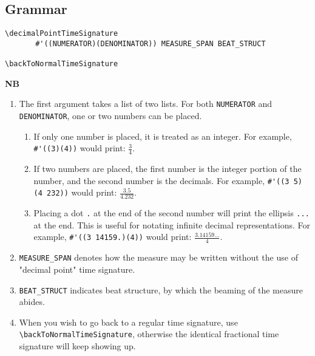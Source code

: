 \subsection{Grammar}
\begin{verbatim}
\decimalPointTimeSignature
       #'((NUMERATOR)(DENOMINATOR)) MEASURE_SPAN BEAT_STRUCT

\backToNormalTimeSignature

\end{verbatim}
\textbf{NB}
\begin{enumerate}
\item The first argument takes a list of two lists. For both \verb|NUMERATOR| and \verb|DENOMINATOR|, one or two numbers can be placed.
\begin{enumerate}
\item If only one number is placed, it is treated as an integer. For example, \verb|#'((3)(4))| would print: \(\frac{3}{4}\).
\item If two numbers are placed, the first number is the integer portion of the number, and the second number is the decimals. For example, \verb|#'((3 5)(4 232))| would print: \(\frac{3.5}{4.232}\). 
\item Placing a dot \verb|.| at the end of the second number will print the ellipsis \verb|...| at the end. This is useful for notating infinite decimal representations. For example, \verb|#'((3 14159.)(4))| would print: \(\frac{3.14159...}{4}\).
\end{enumerate}
\item \verb|MEASURE_SPAN| denotes how the measure may be written without the use of "decimal point" time signature. 
\item \verb |BEAT_STRUCT| indicates beat structure, by which the beaming of the measure abides.
\item When you wish to go back to a regular time signature, use \verb|\backToNormalTimeSignature|, otherwise the identical fractional time signature will keep showing up.
\end{enumerate}

